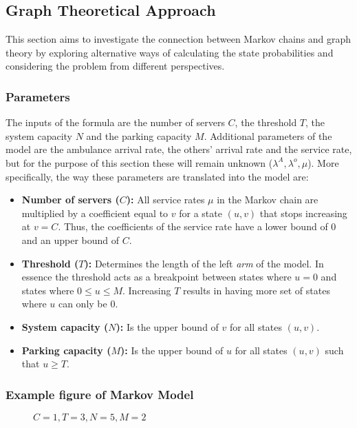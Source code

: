 \subsection{Graph Theoretical Approach}

This section aims to investigate the connection between Markov chains and graph theory by exploring alternative ways of calculating the state probabilities and considering the problem from different perspectives.

\subsubsection{Parameters}
The inputs of the formula are the number of servers \(C\), the threshold \(T\), the system capacity \(N\) and the parking capacity \(M\). 
Additional parameters of the model are the ambulance arrival rate, the others' arrival rate and the service rate, but for the purpose of this section these will remain unknown (\(\lambda^A, \lambda^o, \mu\)). 
More specifically, the way these parameters are translated into the model are:

\begin{itemize}
    \item \textbf{Number of servers (\(C\)):} All service rates \(\mu\) in the Markov chain are multiplied by a coefficient equal to \(v\) for a state \((u,v)\) that stops increasing at \(v=C\). 
    Thus, the coefficients of the service rate have a lower bound of \(0\) and an upper bound of \(C\).
    \item \textbf{Threshold (\(T\)):} Determines the length of the left \textit{arm} of the model. 
    In essence the threshold acts as a breakpoint between states where \(u=0\) and states where \(0 \leq u \leq M\). 
    Increasing \(T\) results in having more set of states where \(u\) can only be \(0\).
    \item \textbf{System capacity (\(N\)):} Is the upper bound of \(v\) for all states \((u,v)\).
    \item \textbf{Parking capacity (\(M\)):} Is the upper bound of \(u\) for all states \((u,v)\) such that \(u \geq T\).
\end{itemize}


\subsubsection{Example figure of Markov Model}

\begin{figure}[h]
    \centering
    
    \caption{\(C=1, T=3, N=5, M=2\)}
    \label{fig:Markov_1352_example_for_closed_form}
\end{figure}

